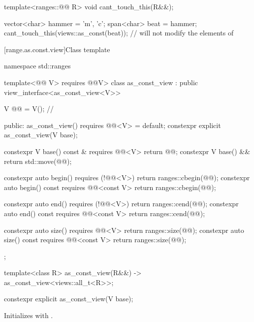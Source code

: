\pnum
\begin{example}
\begin{codeblock}
template<ranges::@@ R>
void cant_touch_this(R&&);

vector<char> hammer = {'m', 'c'};
span<char> beat = hammer;
cant_touch_this(views::as_const(beat));         // will not modify the elements of 
\end{codeblock}
\end{example}

[range.as.const.view]{Class template }

\begin{codeblock}
namespace std::ranges {
  template<@@ V>
    requires @@V>
  class as_const_view : public view_interface<as_const_view<V>> {
    V @@ = V();      // \expos

  public:
    as_const_view() requires @@<V> = default;
    constexpr explicit as_const_view(V base);

    constexpr V base() const & requires @@<V> { return @@; }
    constexpr V base() && { return std::move(@@); }

    constexpr auto begin() requires (!@@<V>) { return ranges::cbegin(@@); }
    constexpr auto begin() const requires @@<const V> { return ranges::cbegin(@@); }

    constexpr auto end() requires (!@@<V>) { return ranges::cend(@@); }
    constexpr auto end() const requires @@<const V> { return ranges::cend(@@); }

    constexpr auto size() requires @@<V> { return ranges::size(@@); }
    constexpr auto size() const requires @@<const V> { return ranges::size(@@); }
  };

  template<class R>
    as_const_view(R&&) -> as_const_view<views::all_t<R>>;
}
\end{codeblock}

\begin{itemdecl}
constexpr explicit as_const_view(V base);
\end{itemdecl}

\begin{itemdescr}
\pnum
\effects
Initializes  with .
\end{itemdescr}

